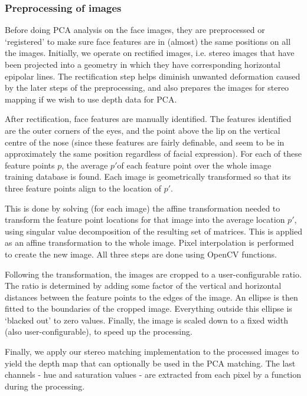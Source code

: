\subsubsection{Preprocessing of images}
\label{sec:preprocess}

Before doing PCA analysis on the face images, they are preprocessed or
`registered' to make sure face features are in (almost) the same positions on
all the images. Initially, we operate on rectified images, i.e. stereo images
that have been projected into a geometry in which they have corresponding
horizontal epipolar lines. The rectification step helps diminish unwanted
deformation caused by the later steps of the preprocessing, and also prepares
the images for stereo mapping if we wish to use depth data for PCA.

After rectification, face features are manually identified. The features
identified are the outer corners of the eyes, and the point above the lip on the
vertical centre of the nose (since these features are fairly definable, and seem
to be in approximately the same position regardless of facial expression). For
each of these feature points $p$, the average $p'$of each feature point over the
whole image training database is found. Each image is geometrically transformed
so that its three feature points align to the location of $p'$.

This is done by solving (for each image) the affine transformation needed to
transform the feature point locations for that image into the average location
$p'$, using singular value decomposition of the resulting set of matrices. This
is applied as an affine transformation to the whole image. Pixel interpolation
is performed to create the new image. All three steps are done using OpenCV
functions.

Following the transformation, the images are cropped to a user-configurable
ratio. The ratio is determined by adding some factor of the vertical and
horizontal distances between the feature points to the edges of the image. An
ellipse is then fitted to the boundaries of the cropped image. Everything
outside this ellipse is `blacked out' to zero values. Finally, the image is
scaled down to a fixed width (also user-configurable), to speed up the
processing.

Finally, we apply our stereo matching implementation to the processed images to
yield the depth map that can optionally be used in the PCA matching. The last
channels - hue and saturation values - are extracted from each pixel by a
function during the processing.

